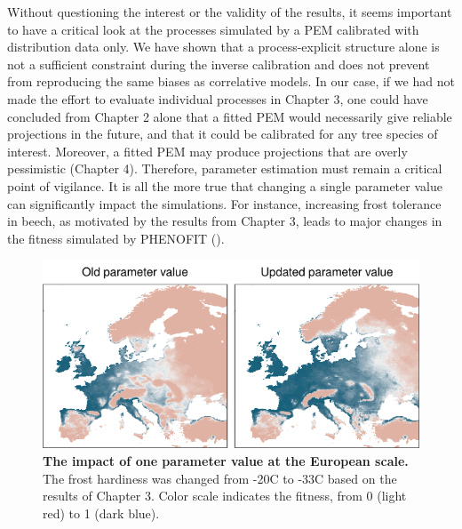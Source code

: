 Without questioning the interest or the validity of the results, it seems important to have a critical look at the processes simulated by a PEM calibrated with distribution data only. We have shown that a process-explicit structure alone is not a sufficient constraint during the inverse calibration and does not prevent from reproducing the same biases as correlative models. In our case, if we had not made the effort to evaluate individual processes in Chapter 3, one could have concluded from Chapter 2 alone that a fitted PEM would necessarily give reliable projections in the future, and that it could be calibrated for any tree species of interest. Moreover, a fitted PEM may produce projections that are overly pessimistic (Chapter 4). Therefore, parameter estimation must remain a critical point of vigilance. It is all the more true that changing a single parameter value can significantly impact the simulations. For instance, increasing frost tolerance in beech, as motivated by the results from Chapter 3, leads to major changes in the fitness simulated by PHENOFIT ().

\begin{figure}
\centering
\includegraphics{discussion/figs/updatedparam.pdf}
\caption{\textbf{The impact of one parameter value at the European scale.} The frost hardiness was changed from -20\degree C to -33\degree C based on the results of Chapter 3. Color scale indicates the fitness, from 0 (light red) to 1 (dark blue).}
\label{fig:updatedparam}
\end{figure}

